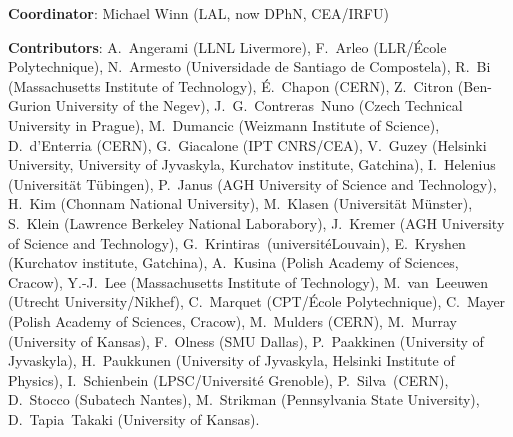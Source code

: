 { \small
\noindent \textbf{Coordinator}: Michael Winn (LAL, now DPhN, CEA/IRFU) %

\noindent \textbf{Contributors}:
A.~Angerami (LLNL Livermore), %
F.~Arleo (LLR/{\'E}cole Polytechnique), %
N.~Armesto (Universidade de Santiago de Compostela), %
R.~Bi (Massachusetts Institute of Technology), %
{\'E}.~Chapon (CERN), %
Z.~Citron (Ben-Gurion University of the Negev), %
J.~G.~Contreras~Nuno (Czech Technical University in Prague),  %
M.~Dumancic (Weizmann Institute of Science),
D.~d'Enterria (CERN), %
G.~Giacalone (IPT CNRS/CEA), %
V.~Guzey (Helsinki University, University of Jyvaskyla, Kurchatov institute, Gatchina),%
I.~Helenius (Universit\"{a}t T\"{u}bingen), %
P.~Janus (AGH University of Science and Technology),
H.~Kim (Chonnam National University), 
M.~Klasen (Universit\"{a}t M\"{u}nster), %
S.~Klein (Lawrence Berkeley National Laborabory), %
J.~Kremer (AGH University of Science and Technology),
G.~Krintiras~(universit\'{e}Louvain),
E.~Kryshen (Kurchatov institute, Gatchina), %
A.~Kusina (Polish Academy of Sciences, Cracow), %
Y.-J.~Lee (Massachusetts Institute of Technology), %
M.~van~Leeuwen (Utrecht University/Nikhef), %
C.~Marquet (CPT/{\'E}cole Polytechnique), %
C.~Mayer  (Polish Academy of Sciences, Cracow), %
M.~Mulders (CERN),
M.~Murray (University of Kansas), %
F.~Olness (SMU Dallas), %
P.~Paakkinen (University of Jyvaskyla), %
H.~Paukkunen (University of Jyvaskyla, Helsinki Institute of Physics), %
I.~Schienbein (LPSC/Universit{\'e} Grenoble),
P.~Silva~(CERN), %
D.~Stocco (Subatech Nantes), %
M.~Strikman (Pennsylvania State University), %
D.~Tapia~Takaki (University of Kansas). %
}

